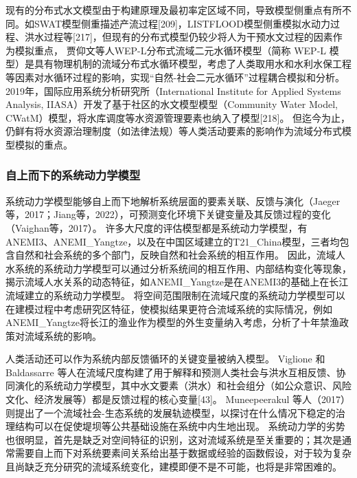 现有的分布式水文模型由于构建原理及最初率定区域不同，导致模型侧重点有所不同。如SWAT模型侧重描述产流过程[209]，LISTFLOOD模型侧重模拟水动力过程、洪水过程等[217]，但现有的分布式模型仍较少将人为干预水文过程的因素作为模拟重点，
贾仰文等人WEP-L分布式流域二元水循环模型（简称 WEP-L 模型）是具有物理机制的流域分布式水循环模型，考虑了人类取用水和水利水保工程等因素对水循环过程的影响，实现“自然-社会二元水循环”过程耦合模拟和分析。 %
2019年，国际应用系统分析研究所（International Institute for Applied Systems Analysis, IIASA）开发了基于社区的水文模型模型（Community Water Model, CWatM）模型，将水库调度等水资源管理要素也纳入了模型[218]。
但迄今为止，仍鲜有将水资源治理制度（如法律法规）等人类活动要素的影响作为流域分布式模型模拟的重点。

\subsubsection*{自上而下的系统动力学模型}

系统动力学模型能够自上而下地解析系统层面的要素关联、反馈与演化（Jaeger等，2017；Jiang等，2022），可预测变化环境下关键变量及其反馈过程的变化（Vaighan等，2017）。
许多大尺度的评估模型都是系统动力学模型，有ANEMI3、ANEMI_Yangtze，以及在中国区域建立的T21_China模型，三者均包含自然和社会系统的多个部门，反映自然和社会系统的相互作用。
因此，流域人水系统的系统动力学模型可以通过分析系统间的相互作用、内部结构变化等现象，揭示流域人水关系的动态特征，如ANEMI_Yangtze是在ANEMI3的基础上在长江流域建立的系统动力学模型。
将空间范围限制在流域尺度的系统动力学模型可以在建模过程中考虑研究区特征，使模拟结果更符合流域系统的实际情况，例如ANEMI_Yangtze将长江的渔业作为模型的外生变量纳入考虑，分析了十年禁渔政策对流域系统的影响。 %

人类活动还可以作为系统内部反馈循环的关键变量被纳入模型。
Viglione 和 Baldassarre 等人在流域尺度构建了用于解释和预测人类社会与洪水互相反馈、协同演化的系统动力学模型，其中水文要素（洪水）和社会组分（如公众意识、风险文化、经济发展等）都是反馈过程的核心变量[43]。
Muneepeerakul 等人（2017）则提出了一个流域社会-生态系统的发展轨迹模型，以探讨在什么情况下稳定的治理结构可以在促使堤坝等公共基础设施在系统中内生地出现\cite{muneepeerakul2017}。
系统动力学的劣势也很明显，首先是缺乏对空间特征的识别，这对流域系统是至关重要的；其次是通常需要自上而下对系统要素间关系给出基于数据或经验的函数假设，对于较为复杂且尚缺乏充分研究的流域系统变化，建模即便不是不可能，也将是非常困难的。

